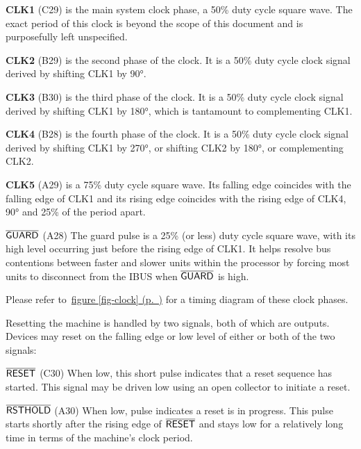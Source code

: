 \documentclass[11pt,a4paper,twocolumns]{article}
\newcommand{\cf}[2][section]{\hyperref[#2]{#1 \ref*{#2} (p.~\pageref*{#2})}}
\newcommand{\fcf}[1]{\cf[figure]{#1}}
\newcommand{\ns}[1]{$\overline{\mbox{\textsf{{#1}}}}$}
\newcommand{\ps}[1]{\textsf{#1}}
\newcommand\bus[1]{{#1}}
\newcommand\IBUS{\bus{IBUS}}
\newcommand\GUARDPULSE{\ns{GUARD}}
\newcommand\GP{\GUARDPULSE}
\newcommand\CLOCK[1]{\ps{CLK{#1}}}
\newcommand\RSTHOLD{\ns{RSTHOLD}}
\newcommand\RESET{\ns{RESET}}
\begin{document}
\begin{description}
  \item{\bf \CLOCK{1}} (C29) is the main system clock phase, a 50\% duty
    cycle square wave. The exact period of this clock is beyond the
    scope of this document and is purposefully left unspecified.
  \item{\bf \CLOCK{2}} (B29) is the second phase of the clock. It is a 50\% duty
    cycle clock signal derived by shifting \CLOCK{1} by 90°.
  \item{\bf \CLOCK{3}} (B30) is the third phase of the clock. It is a
    50\% duty cycle clock signal derived by shifting \CLOCK{1} by 180°,
    which is tantamount to complementing \CLOCK{1}.
  \item{\bf \CLOCK{4}} (B28) is the fourth phase of the clock. It is a
    50\% duty cycle clock signal derived by shifting \CLOCK{1} by 270°,
    or shifting \CLOCK{2} by 180°, or complementing \CLOCK{2}.
  \item{\bf \CLOCK{5}} (A29) is a 75\% duty cycle square wave. Its
    falling edge coincides with the falling edge of \CLOCK{1} and its
    rising edge coincides with the rising edge of \CLOCK{4}, 90° and
    25\% of the period apart.
  \item{\bf\GP} (A28) The guard pulse is a 25\% (or
    less) duty cycle square wave, with its high level occurring just
    before the rising edge of \CLOCK{1}. It helps resolve bus
    contentions between faster and slower units within the processor
    by forcing most units to disconnect from the \IBUS{} when \GP{} is
    high.
\end{description}

Please refer to~\fcf{fig-clock} for a timing diagram of these clock phases.

Resetting the machine is handled by two signals, both of which are
outputs. Devices may reset on the falling edge or low level of either
or both of the two signals:

\begin{description}
  \item{\bf\RESET} (C30) When low, this short pulse indicates that a
    reset sequence has started. This signal may be driven low using an
    open collector to initiate a reset.
  \item{\bf\RSTHOLD} (A30) When low, pulse indicates a reset is in
    progress. This pulse starts shortly after the rising edge of
    \RESET{} and stays low for a relatively long time in terms of the
    machine's clock period.
\end{description}
\end{document}
